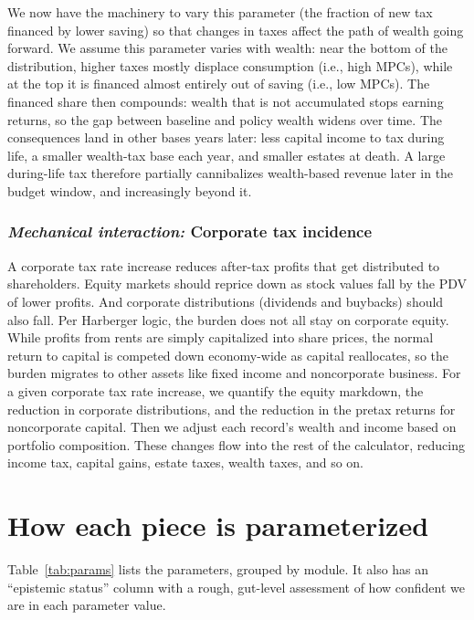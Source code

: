 \documentclass[10pt,twocolumn]{article}
\begin{document}
We now have the machinery to vary this parameter (the fraction of new tax
financed by lower saving) so that changes in taxes affect the path of wealth
going forward. We assume this parameter varies with wealth: near the bottom of
the distribution, higher taxes mostly displace consumption (i.e., high MPCs),
while at the top it is financed almost entirely out of saving (i.e., low
MPCs). The financed share then compounds: wealth that is not accumulated stops
earning returns, so the gap between baseline and policy wealth widens over
time. The consequences land in other bases years later: less capital income to
tax during life, a smaller wealth-tax base each year, and smaller estates at
death. A large during-life tax therefore partially cannibalizes wealth-based
revenue later in the budget window, and increasingly beyond it.

\subsubsection*{\textit{Mechanical interaction:} Corporate tax incidence}

A corporate tax rate increase reduces after-tax profits that get distributed
to shareholders. Equity markets should reprice down as stock values fall by
the PDV of lower profits. And corporate distributions (dividends and buybacks)
should also fall. Per Harberger logic, the burden does not all stay on
corporate equity. While profits from rents are simply capitalized into share
prices, the normal return to capital is competed down economy-wide as capital
reallocates, so the burden migrates to other assets like fixed income and
noncorporate business. For a given corporate tax rate increase, we quantify
the equity markdown, the reduction in corporate distributions, and the
reduction in the pretax returns for noncorporate capital. Then we adjust each
record's wealth and income based on portfolio composition. These changes flow
into the rest of the calculator, reducing income tax, capital gains, estate
taxes, wealth taxes, and so on.

\section{How each piece is parameterized}

Table~\ref{tab:params} lists the parameters, grouped by module. It also has
an ``epistemic status'' column with a rough, gut-level assessment of how
confident we are in each parameter value.
\end{document}
